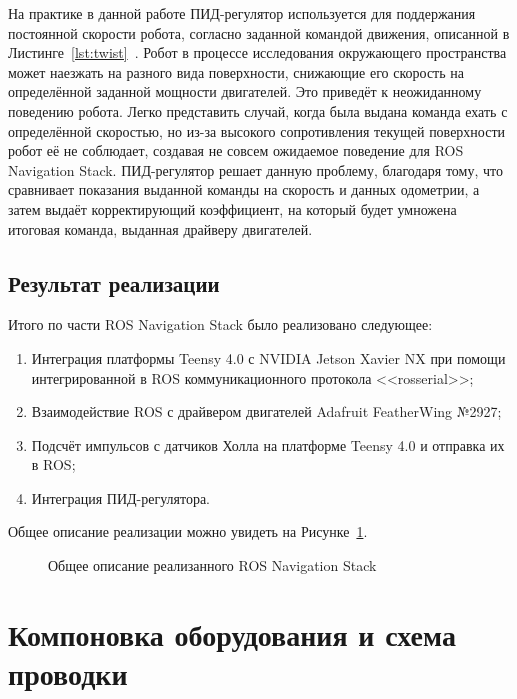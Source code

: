 На практике в данной работе ПИД-регулятор используется для поддержания постоянной скорости робота, согласно заданной командой движения, описанной в Листинге~\cref{lst:twist}~\cite{twist}. Робот в процессе исследования окружающего пространства может наезжать на разного вида поверхности, снижающие его скорость на определённой заданной мощности двигателей. Это приведёт к неожиданному поведению робота. Легко представить случай, когда была выдана команда ехать с определённой скоростью, но из-за высокого сопротивления текущей поверхности робот её не соблюдает, создавая не совсем ожидаемое поведение для ROS Navigation Stack. ПИД-регулятор решает данную проблему, благодаря тому, что сравнивает показания выданной команды на скорость и данных одометрии, а затем выдаёт корректирующий коэффициент, на который будет умножена итоговая команда, выданная драйверу двигателей.

\subsection{Результат реализации}

Итого по части ROS Navigation Stack было реализовано следующее:
\begin{enumerate}[beginpenalty=10000] %
  \item Интеграция платформы Teensy 4.0 с NVIDIA Jetson Xavier NX при помощи интегрированной в ROS коммуникационного протокола <<rosserial>>;
  \item Взаимодействие ROS с драйвером двигателей Adafruit FeatherWing №2927;
  \item Подсчёт импульсов с датчиков Холла на платформе Teensy 4.0 и отправка их в ROS;
  \item Интеграция ПИД-регулятора. 
\end{enumerate}

Общее описание реализации можно увидеть на Рисунке~\cref{fig:navstack}.

\begin{figure}[ht]
    \caption{Общее описание реализанного ROS Navigation Stack}\label{fig:navstack}
\end{figure}

\section{Компоновка оборудования и схема проводки}

